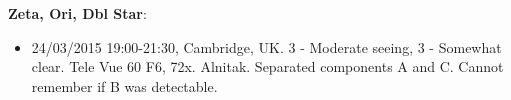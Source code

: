 {\bf Zeta, Ori, Dbl Star}:
\begin{itemize}
\item 24/03/2015 19:00-21:30, Cambridge, UK. 3 - Moderate seeing, 3 - Somewhat clear. Tele Vue 60 F6, 72x. Alnitak. Separated components A and C. Cannot remember if B was detectable.
\end{itemize}
